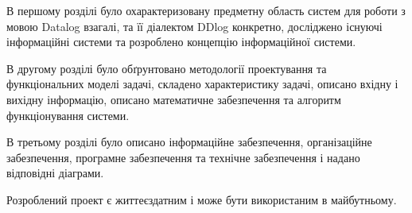 
В першому розділі було охарактеризовану предметну область систем для роботи з мовою Datalog взагалі, та її діалектом DDlog конкретно, досліджено існуючі інформаційні системи та розроблено концепцію інформаційної системи.

В другому розділі було обґрунтовано методології проектування та функціональних моделі задачі, складено характеристику задачі, описано вхідну і вихідну інформацію, описано математичне забезпечення та алгоритм функціонування системи.

В третьому розділі було описано інформаційне забезпечення, організаційне забезпечення, програмне забезпечення та технічне забезпечення і надано відповідні діаграми.

Розроблений проект є життеєздатним і може бути використаним в майбутньому.
